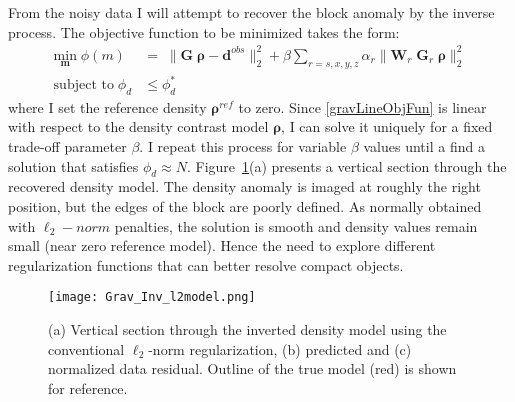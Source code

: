 From the noisy data I will attempt to recover the block anomaly by the inverse process. The objective function to be minimized takes the form:
\begin{equation}
\begin{split}
\underset{\mathbf{m}}{\text{min}}\; \phi(m) & = \; \|\mathbf{G}\;\boldsymbol{\rho} - \mathbf{d}^{obs}\|_2^2 + \beta \sum_{r=s,x,y,z} \alpha_r \|\mathbf{W}_r \;\mathbf{G}_r \;\boldsymbol{\rho}\|_2^2 \\
\text{subject to} \; \phi_d & \leq \phi_d^* \;
\end{split}\label{gravLineObjFun}
\end{equation}
where I set the reference density $\boldsymbol{\rho}^{ref}$ to zero.
Since \eqref{gravLineObjFun} is linear with respect to the density contrast model $\boldsymbol{\rho}$, I can solve it uniquely for a fixed trade-off parameter $\beta$. I repeat this process for variable $\beta$ values until a find a solution that satisfies $\phi_d \approx N$. Figure~\ref{Grav_l2model}(a) presents a vertical section through the recovered density model. The density anomaly is imaged at roughly the right position, but the edges of the block are poorly defined. As normally obtained with $\ell_2-norm$ penalties, the solution is smooth and density values remain small (near zero reference model). Hence the need to explore different regularization functions that can better resolve compact objects.
\begin{figure}
\texttt{[image: Grav\_Inv\_l2model.png]}
\caption{(a) Vertical section through the inverted density model using the conventional $\ell_2$-norm regularization, (b) predicted and (c) normalized data residual. Outline of the true model (red) is shown for reference.}
\label{Grav_l2model}
\end{figure}


